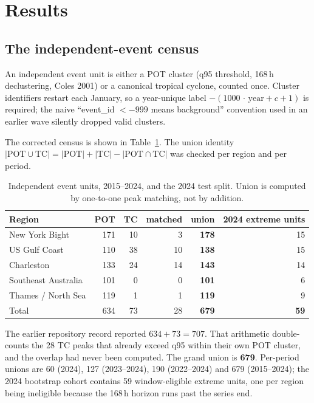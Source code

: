 \section{Results}
\label{sec:results}

\subsection{The independent-event census}
\label{sec:results-census}

An independent event unit is either a POT cluster (q95 threshold, 168\,h
declustering, Coles 2001) or a canonical tropical cyclone, counted once. Cluster
identifiers restart each January, so a year-unique label
$-(1000\,\cdot\,\text{year} + c + 1)$ is required; the naive
``event\_id $< -999$ means background'' convention used in an earlier wave
silently dropped valid clusters.

The corrected census is shown in Table~\ref{tab:census}. The union identity
$|\text{POT} \cup \text{TC}| = |\text{POT}| + |\text{TC}| - |\text{POT} \cap
\text{TC}|$ was checked per region and per period.

\begin{table}[htbp]
\centering
\caption{Independent event units, 2015--2024, and the 2024 test split.
Union is computed by one-to-one peak matching, not by addition.}
\begin{tabular}{l r r r r r}
\toprule
Region & POT & TC & matched & \textbf{union} & 2024 extreme units \\
\midrule
New York Bight        & 171 & 10 & 3  & \textbf{178} & 15 \\
US Gulf Coast         & 110 & 38 & 10 & \textbf{138} & 15 \\
Charleston            & 133 & 24 & 14 & \textbf{143} & 14 \\
Southeast Australia   & 101 & 0  & 0  & \textbf{101} & 6  \\
Thames / North Sea    & 119 & 1  & 1  & \textbf{119} & 9  \\
\midrule
Total                 & 634 & 73 & 28 & \textbf{679} & \textbf{59} \\
\bottomrule
\end{tabular}
\label{tab:census}
\end{table}

The earlier repository record reported $634 + 73 = 707$. That arithmetic
double-counts the 28 TC peaks that already exceed q95 within their own POT
cluster, and the overlap had never been computed. The grand union is
\textbf{679}. Per-period unions are 60 (2024), 127 (2023--2024), 190
(2022--2024) and 679 (2015--2024); the 2024 bootstrap cohort contains 59
window-eligible extreme units, one per region being ineligible because the
168\,h horizon runs past the series end.

